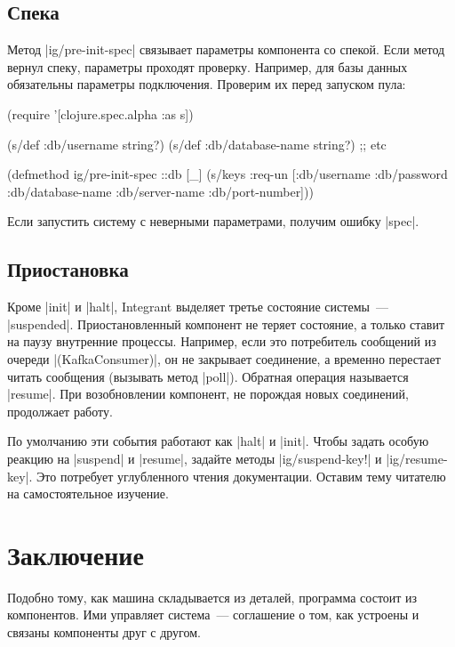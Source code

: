 \subsection{Спека}

Метод \spverb|ig/pre-init-spec| связывает параметры компонента со спекой. Если
метод вернул спеку, параметры проходят проверку. Например, для базы данных
обязательны параметры подключения. Проверим их перед запуском пула:

\begin{english}
  \begin{clojure}
(require '[clojure.spec.alpha :as s])

(s/def :db/username string?)
(s/def :db/database-name string?)
;; etc

(defmethod ig/pre-init-spec ::db [_]
  (s/keys :req-un [:db/username
                   :db/password
                   :db/database-name
                   :db/server-name
                   :db/port-number]))
  \end{clojure}
\end{english}

Если запустить систему с неверными параметрами, получим ошибку \spverb|spec|.

\subsection{Приостановка}

Кроме \spverb|init| и \spverb|halt|, Integrant выделяет третье
состояние системы~--- \spverb|suspended|. Приостановленный компонент не теряет
состояние, а только ставит на паузу внутренние процессы. Например, если это
потребитель сообщений из очереди \spverb|(KafkaConsumer)|, он не закрывает
соединение, а временно перестает читать сообщения (вызывать метод
\spverb|poll|). Обратная операция называется \spverb|resume|. При возобновлении
компонент, не порождая новых соединений, продолжает работу.

По умолчанию эти события работают как \spverb|halt| и \spverb|init|. Чтобы
задать особую реакцию на \spverb|suspend| и \spverb|resume|, задайте методы
\spverb|ig/suspend-key!| и \spverb|ig/resume-key|. Это потребует углубленного
чтения документации. Оставим тему читателю на самостоятельное изучение.

\section{Заключение}

Подобно тому, как машина складывается из деталей, программа состоит из
компонентов. Ими управляет система~--- соглашение о том, как устроены и связаны
компоненты друг с другом.


